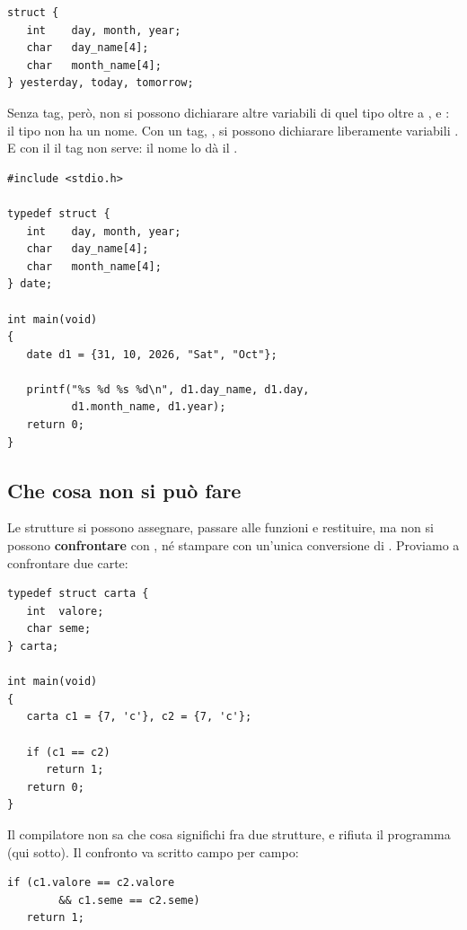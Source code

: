 \begin{lstlisting}[style=c]
struct {
   int    day, month, year;
   char   day_name[4];
   char   month_name[4];
} yesterday, today, tomorrow;
\end{lstlisting}

Senza tag, però, non si possono dichiarare altre variabili di quel tipo oltre
a ,  e : il tipo non ha un nome.
Con un tag, , si possono dichiarare
liberamente variabili . E con il  il tag non
serve: il nome lo dà il .

\begin{affianco}[0.55][c]
\begin{lstlisting}[style=c, name=data.c]
#include <stdio.h>

typedef struct {
   int    day, month, year;
   char   day_name[4];
   char   month_name[4];
} date;

int main(void)
{
   date d1 = {31, 10, 2026, "Sat", "Oct"};

   printf("%s %d %s %d\n", d1.day_name, d1.day,
          d1.month_name, d1.year);
   return 0;
}
\end{lstlisting}
\risultato
{}
\end{affianco}

\subsection{Che cosa non si può fare}

Le strutture si possono assegnare, passare alle funzioni e restituire, ma non
si possono \textbf{confrontare} con \code{==}, né stampare con un'unica
conversione di . Proviamo a confrontare due carte:

\begin{affianco}[0.5][c]
\begin{lstlisting}[style=c, name=confronta.c]
typedef struct carta {
   int  valore;
   char seme;
} carta;

int main(void)
{
   carta c1 = {7, 'c'}, c2 = {7, 'c'};

   if (c1 == c2)
      return 1;
   return 0;
}
\end{lstlisting}
\risultato
Il compilatore non sa che cosa significhi \code{==} fra due strutture, e
rifiuta il programma (qui sotto). Il confronto va scritto campo per campo:

\vspace{4pt}
\begin{lstlisting}[style=c]
if (c1.valore == c2.valore
        && c1.seme == c2.seme)
   return 1;
\end{lstlisting}
\end{affianco}

